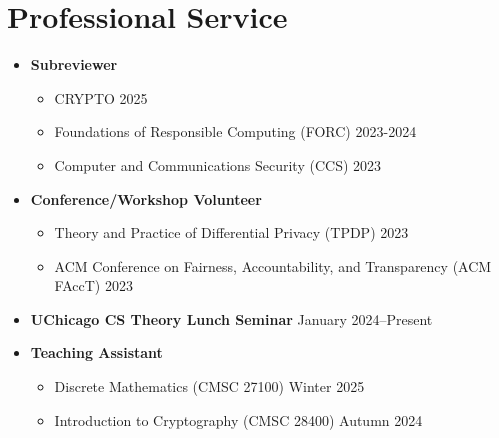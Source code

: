 
\section*{Professional Service}

\begin{itemize}
    \item \textbf{Subreviewer}
    \begin{itemize}
        \item CRYPTO \hfill 2025
        \item Foundations of Responsible Computing (FORC) \hfill 2023-2024
        \item Computer and Communications Security (CCS) \hfill 2023
    \end{itemize}
    \item \textbf{Conference/Workshop Volunteer}
    \begin{itemize}
        \item Theory and Practice of Differential Privacy (TPDP) \hfill 2023
        \item ACM Conference on Fairness, Accountability, and Transparency (ACM FAccT) \hfill 2023
    \end{itemize}
    \item \textbf{UChicago CS Theory Lunch Seminar} \hfill January 2024--Present
    \item \textbf{Teaching Assistant}
    \begin{itemize}
        \item Discrete Mathematics (CMSC 27100) \hfill Winter 2025
        \item Introduction to Cryptography (CMSC 28400) \hfill Autumn 2024
    \end{itemize}
\end{itemize}

